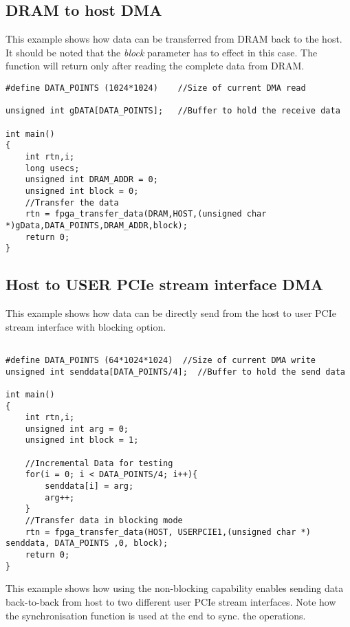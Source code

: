 \subsection{DRAM to host DMA}
This example shows how data can be transferred from DRAM back to the host.
It should be noted that the \emph{block} parameter has to effect in this case.
The function will return only after reading the complete data from DRAM.
\begin{verbatim}
#define DATA_POINTS (1024*1024)    //Size of current DMA read

unsigned int gDATA[DATA_POINTS];   //Buffer to hold the receive data

int main() 
{
    int rtn,i;
    long usecs;
    unsigned int DRAM_ADDR = 0;
    unsigned int block = 0;
    //Transfer the data
    rtn = fpga_transfer_data(DRAM,HOST,(unsigned char *)gData,DATA_POINTS,DRAM_ADDR,block);
    return 0;
}

\end{verbatim}

\subsection{Host to USER PCIe stream interface DMA}
This example shows how data can be directly send from the host to user PCIe stream interface with blocking option.
\begin{verbatim}

#define DATA_POINTS (64*1024*1024)  //Size of current DMA write
unsigned int senddata[DATA_POINTS/4];  //Buffer to hold the send data

int main() 
{
    int rtn,i;
    unsigned int arg = 0;
    unsigned int block = 1;

    //Incremental Data for testing
    for(i = 0; i < DATA_POINTS/4; i++){
        senddata[i] = arg;
        arg++;
    }
    //Transfer data in blocking mode
    rtn = fpga_transfer_data(HOST, USERPCIE1,(unsigned char *) senddata, DATA_POINTS ,0, block);
    return 0;
}
\end{verbatim}

This example shows how using the non-blocking capability enables sending data back-to-back from host to two different user PCIe stream interfaces.
Note how the synchronisation function is used at the end to sync. the operations.

